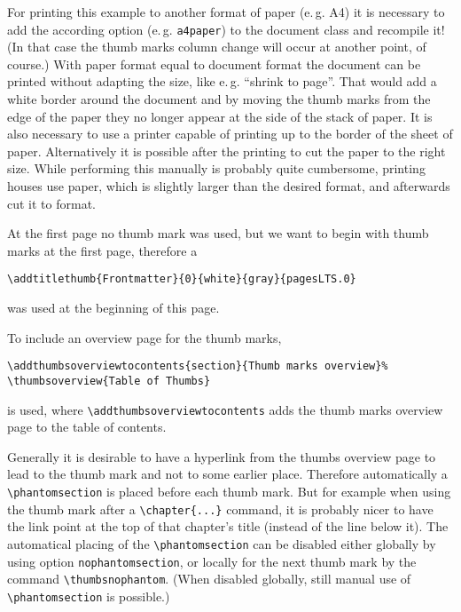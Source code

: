 \documentclass[twoside,british]{article}[2007/10/19]%
\begin{document}
\bigskip

For printing this example to another format of paper (e.\,g. A4)
it is necessary to add the according option (e.\,g. \verb|a4paper|)
to the document class and recompile it! (In that case the
thumb marks column change will occur at another point, of course.)
With paper format equal to document format the document can be printed
without adapting the size, like e.\,g.
\textquotedblleft shrink to page\textquotedblright .
That would add a white border around the document
and by moving the thumb marks from the edge of the paper they no longer appear
at the side of the stack of paper. It is also necessary to use a printer
capable of printing up to the border of the sheet of paper. Alternatively
it is possible after the printing to cut the paper to the right size.
While performing this manually is probably quite cumbersome,
printing houses use paper, which is slightly larger than the
desired format, and afterwards cut it to format.

\newpage


At the first page no thumb mark was used, but we want to begin with thumb marks
at the first page, therefore a
\begin{verbatim}
\addtitlethumb{Frontmatter}{0}{white}{gray}{pagesLTS.0}
\end{verbatim}
was used at the beginning of this page.

\newpage

\tableofcontents

\newpage

To include an overview page for the thumb marks,
\begin{verbatim}
\addthumbsoverviewtocontents{section}{Thumb marks overview}%
\thumbsoverview{Table of Thumbs}
\end{verbatim}
is used, where \verb|\addthumbsoverviewtocontents| adds the thumb
marks overview page to the table of contents.

\smallskip

Generally it is desirable to have a hyperlink from the thumbs overview page
to lead to the thumb mark and not to some earlier place. Therefore automatically
a \verb|\phantomsection| is placed before each thumb mark. But for example when
using the thumb mark after a \verb|\chapter{...}| command, it is probably nicer
to have the link point at the top of that chapter's title (instead of the line
below it). The automatical placing of the \verb|\phantomsection| can be disabled
either globally by using option \texttt{nophantomsection}, or locally for the next
thumb mark by the command \verb|\thumbsnophantom|. (When disabled globally,
still manual use of \verb|\phantomsection| is possible.)
\end{document}
